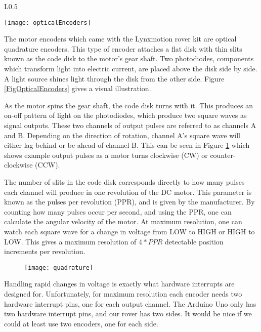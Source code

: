 \begin{wrapfigure}{L}{0.5\textwidth}
	\caption{\cite{fig_optical_encoders}}
	\centering
	\texttt{[image: opticalEncoders]}
	\label{FigOpticalEncoders}
\end{wrapfigure}

The motor encoders which came with the Lynxmotion rover kit are optical quadrature encoders. This type of encoder attaches a flat disk with thin slits known as the code disk to the motor's gear shaft. Two photodiodes, components which transform light into electric current, are placed above the disk side by side. A light source shines light through the disk from the other side. Figure \ref{FigOpticalEncoders} gives a visual illustration.

As the motor spins the gear shaft, the code disk turns with it. This produces an on-off pattern of light on the photodiodes, which produce two square waves as signal outputs. These two channels of output pulses are referred to as channels A and B. Depending on the direction of rotation, channel A's square wave will either lag behind or be ahead of channel B. This can be seen in Figure \ref{FigQuadChannels} which shows example output pulses as a motor turns clockwise (CW) or counter-clockwise (CCW). \cite{encoderBlog}

The number of slits in the code disk corresponds directly to how many pulses each channel will produce in one revolution of the DC motor. This parameter is known as the pulses per revolution (PPR), and is given by the manufacturer. By counting how many pulses occur per second, and using the PPR, one can calculate the angular velocity of the motor. At maximum resolution, one can watch each square wave for a change in voltage from LOW to HIGH or HIGH to LOW. This gives a maximum resolution of \(4 * PPR\) detectable position increments per revolution.

\begin{figure}[h]
	\caption{\cite{encoderBlog}}
	\centering
	\texttt{[image: quadrature]}
	\label{FigQuadChannels}
\end{figure}

Handling rapid changes in voltage is exactly what hardware interrupts are designed for. Unfortunately, for maximum resolution each encoder needs two hardware interrupt pins, one for each output channel. The Arduino Uno only has two hardware interrupt pins, and our rover has two sides. It would be nice if we could at least use two encoders, one for each side.

